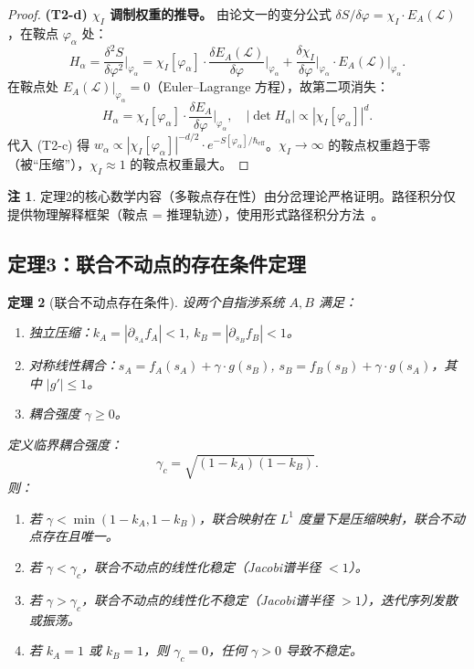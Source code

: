 \documentclass[12pt,a4paper]{article}
\newtheorem{theorem}{定理}[section]
\theoremstyle{definition}
\newtheorem{remark}[theorem]{注}
\newcommand{\mL}{\mathcal{L}}
\newcommand{\chiI}{\chi_I}
\newcommand{\EA}{E_A}
\newcommand{\Heff}{\hbar_{\mathrm{eff}}}
\newcommand{\gamc}{\gamma_c}
\begin{document}
\begin{proof}
\textbf{(T2-d) $\chiI$ 调制权重的推导。}
由论文一的变分公式 $\delta S / \delta\varphi = \chiI \cdot \EA(\mL)$，在鞍点 $\varphi_\alpha$ 处：
\begin{equation}
H_\alpha = \frac{\delta^2 S}{\delta\varphi^2}\bigg|_{\varphi_\alpha} = \chiI[\varphi_\alpha] \cdot \frac{\delta \EA(\mL)}{\delta\varphi}\bigg|_{\varphi_\alpha} + \frac{\delta \chiI}{\delta\varphi}\bigg|_{\varphi_\alpha} \cdot \EA(\mL)|_{\varphi_\alpha}.
\end{equation}
在鞍点处 $\EA(\mL)|_{\varphi_\alpha} = 0$（Euler--Lagrange 方程），故第二项消失：
\begin{equation}
H_\alpha = \chiI[\varphi_\alpha] \cdot \frac{\delta \EA}{\delta\varphi}\bigg|_{\varphi_\alpha}, \quad |\det H_\alpha| \propto |\chiI[\varphi_\alpha]|^d.
\end{equation}
代入 (T2-c) 得 $w_\alpha \propto |\chiI[\varphi_\alpha]|^{-d/2} \cdot e^{-S[\varphi_\alpha]/\Heff}$。$\chiI \to \infty$ 的鞍点权重趋于零（被“压缩”），$\chiI \approx 1$ 的鞍点权重最大。
\end{proof}

\begin{remark}
定理2的核心数学内容（多鞍点存在性）由分岔理论严格证明。路径积分仅提供物理解释框架（鞍点 = 推理轨迹），使用形式路径积分方法~\cite{Kleinert2009, ZinnJustin2002}。
\end{remark}

\subsection{定理3：联合不动点的存在条件定理}

\begin{theorem}[联合不动点存在条件]
\label{thm:t3}
设两个自指涉系统 $A, B$ 满足：
\begin{enumerate}[label=(B\arabic*)]
\item 独立压缩：$k_A = |\partial_{s_A} f_A| < 1$, $k_B = |\partial_{s_B} f_B| < 1$。
\item 对称线性耦合：$s_A = f_A(s_A) + \gamma \cdot g(s_B)$, $s_B = f_B(s_B) + \gamma \cdot g(s_A)$，其中 $|g'| \leq 1$。
\item 耦合强度 $\gamma \geq 0$。
\end{enumerate}
定义临界耦合强度：
\begin{equation}
\label{eq:gamc}
\gamc = \sqrt{(1 - k_A)(1 - k_B)}.
\end{equation}
则：
\begin{enumerate}[label=(T3-\alph*)]
\item [\textbf{(T3-a)}] 若 $\gamma < \min(1 - k_A, 1 - k_B)$，联合映射在 $L^1$ 度量下是压缩映射，联合不动点存在且唯一。
\item [\textbf{(T3-b)}] 若 $\gamma < \gamc$，联合不动点的线性化稳定（Jacobi谱半径 $< 1$）。
\item [\textbf{(T3-c)}] 若 $\gamma > \gamc$，联合不动点的线性化不稳定（Jacobi谱半径 $> 1$），迭代序列发散或振荡。
\item [\textbf{(T3-d)}] 若 $k_A = 1$ 或 $k_B = 1$，则 $\gamc = 0$，任何 $\gamma > 0$ 导致不稳定。
\end{enumerate}
\end{theorem}
\end{document}
